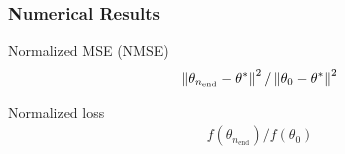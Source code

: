 \begin{frame}
\begin{small}
\frametitle{\centering Numerical Results}
\begin{block}{Normalized MSE (NMSE) }
\begin{align}
\left\| \theta_{n_\text{end}} - \theta^* \right\|^2 / \left\| \theta_0 - \theta^*\right\|^2
\end{align}
\end{block}
\begin{block}{ Normalized loss}
\begin{align} 
f(\theta_{n_\text{end}})/f(\theta_0)
 \end{align} 
 \end{block}
 \end{small}
\end{frame}


